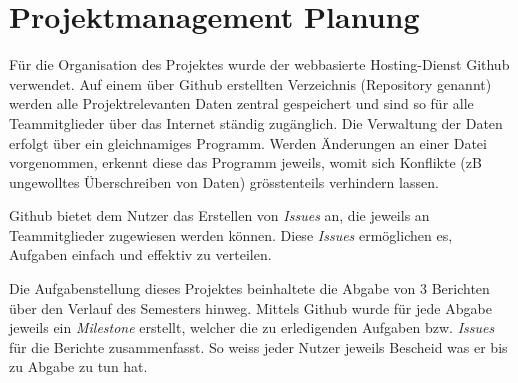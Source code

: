 \section{Projektmanagement Planung}
Für die Organisation des Projektes wurde der webbasierte Hosting-Dienst Github verwendet. Auf einem über Github erstellten Verzeichnis (Repository genannt) werden alle Projektrelevanten Daten zentral gespeichert und sind so für alle Teammitglieder über das Internet ständig zugänglich. Die Verwaltung der Daten erfolgt über ein gleichnamiges Programm. Werden Änderungen an einer Datei vorgenommen, erkennt diese das Programm jeweils, womit sich Konflikte (zB ungewolltes Überschreiben von Daten) grösstenteils verhindern lassen.

Github bietet dem Nutzer das Erstellen von \emph{Issues} an, die jeweils an Teammitglieder zugewiesen werden können. Diese \emph{Issues} ermöglichen es, Aufgaben einfach und effektiv zu verteilen.

Die Aufgabenstellung dieses Projektes beinhaltete die Abgabe von 3 Berichten über den Verlauf des Semesters hinweg. Mittels Github wurde für jede Abgabe jeweils ein \emph{Milestone} erstellt, welcher die zu erledigenden Aufgaben bzw. \emph{Issues} für die Berichte zusammenfasst. So weiss jeder Nutzer jeweils Bescheid was er bis zu Abgabe zu tun hat.







